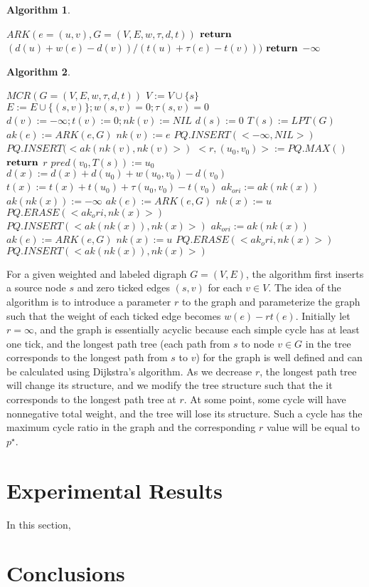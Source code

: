 \documentclass[sigconf, 10pt, twocolumn]{acmart}
\newtheorem{algorithm}{Algorithm}
\begin{document}
\begin{algorithm} \small
\begin{algorithmic}
\State $ARK(e = (u, v), G = (V, E, w, \tau, d, t))$
\State $\bold{return}$  $(d(u) + w(e) - d(v))/(t(u) + \tau(e) - t(v)))$
\Else
\State $\bold{return}$  $-\infty$
\EndIf
\end{algorithmic}
\caption{Find Arc Key Function}
\label{algorithm:AK}
\end{algorithm}
\begin{algorithm} \small
\begin{algorithmic}
\State $MCR(G = (V, E, w, \tau, d, t))$
\State $V := V \cup \{s\}$
\State $E := E \cup \{(s, v)\}; w(s, v) = 0; \tau(s, v) = 0$
\State $d(v) := -\infty; t(v) := 0; nk(v) := NIL$
\EndFor
\State $d(s) := 0$
\State $T(s) := LPT(G)$
\State $ak(e) := ARK(e, G)$
\State $nk(v) := e$
\EndIf
\EndFor
\State $PQ.INSERT(<-\infty, NIL>)$
\State $PQ.INSERT(<ak(nk(v), nk(v)>)$
\EndFor
{}
\State $<r, (u_0, v_0)> := PQ.MAX()$
\State $\bold{return}$  $r$
\EndIf
\State $pred(v_0, T(s)) := u_0$
\State $d(x) := d(x) + d(u_0) + w(u_0, v_0) - d(v_0)$
\State $t(x) := t(x) + t(u_0) + \tau(u_0, v_0) - t(v_0)$
\EndFor
{}
\State $ak_{ori} := ak(nk(x))$
\State $ak(nk(x)) := -\infty$
\State $ak(e) := ARK(e, G)$
\State $nk(x) := u$
\EndIf
\EndFor
\State $PQ.ERASE(<ak_ori, nk(x)>)$
\State $PQ.INSERT(<ak(nk(x)), nk(x)>)$
\State $ak_{ori} := ak(nk(x))$
\State $ak(e) := ARK(e, G)$
\State $nk(x) := u$
\State $PQ.ERASE(<ak_ori, nk(x)>)$
\State $PQ.INSERT(<ak(nk(x)), nk(x)>)$
\EndIf
\EndFor
\EndFor
\EndWhile
\end{algorithmic}
\caption{Young-Tarjan-Orlin's Critical Cycle Ratio Algorithm}
\label{algorithm:YTO}
\end{algorithm}


For a given weighted and labeled digraph $G = (V, E)$, the algorithm first inserts a source node $s$ and zero ticked edges $(s, v)$ for each $v \in V$. The idea of the algorithm is to introduce a parameter $r$ to the graph and parameterize the graph such that the weight of each ticked edge becomes $w(e) - rt(e)$. Initially let $r = \infty$, and the graph is essentially acyclic because each simple cycle has at least one tick, and the longest path tree (each path from $s$ to node $v \in G$ in the tree corresponds to the longest path from $s$ to $v$) for the graph is well defined and can be calculated using Dijkstra's algorithm. As we decrease $r$, the longest path tree will change its structure, and we modify the tree structure such that the it corresponds to the longest path tree at $r$. At some point, some cycle will have nonnegative total weight, and the tree will lose its structure. Such a cycle has the maximum cycle ratio in the graph and the corresponding $r$ value will be equal to $p^\star$.

\section{Experimental Results}
In this section,
\section{Conclusions}


\end{document}
